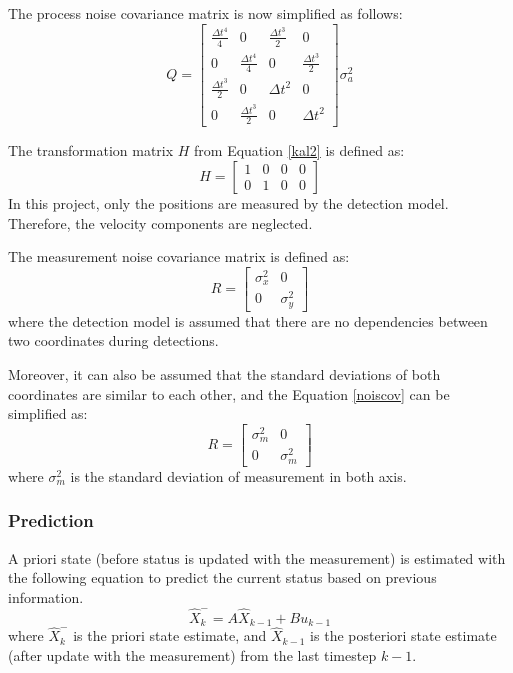 The process noise covariance matrix is now simplified as follows:
\begin{equation} \label{covQsimp}
Q = 
\begin{bmatrix}
    \frac{\Delta t^4}{4} & 0 & \frac{\Delta t^3}{2} & 0 \\
    0 & \frac{\Delta t^4}{4} & 0 & \frac{\Delta t^3}{2} \\
    \frac{\Delta t^3}{2} & 0 & \Delta t^2 & 0 \\
    0 & \frac{\Delta t^3}{2} & 0 & \Delta t^2
\end{bmatrix}
\sigma_a^2
\end{equation}

The transformation matrix \(H\) from Equation \ref{kal2} is defined as:
\begin{equation} \label{transmat}
H = 
\begin{bmatrix}
    1 & 0 & 0 & 0 \\
    0 & 1 & 0 & 0
\end{bmatrix}
\end{equation}
In this project, only the positions are measured by the detection model. Therefore, the velocity components are neglected. 

The measurement noise covariance matrix is defined as:
\begin{equation} \label{noiscov}
R = 
\begin{bmatrix}
\sigma_x^2 & 0 \\
0 & \sigma_y^2
\end{bmatrix}
\end{equation}
where the detection model is assumed that there are no dependencies between two coordinates during detections.

Moreover, it can also be assumed that the standard deviations of both coordinates are similar to each other, and the Equation \ref{noiscov} can be simplified as:
\begin{equation}
    \label{noiscovsimp}
    R=
    \begin{bmatrix}
        \sigma_m^2 & 0 \\
        0 & \sigma_m^2
    \end{bmatrix}
\end{equation}
where \(\sigma_m^2\) is the standard deviation of measurement in both axis. 

\subsubsection{Prediction}
A priori state (before status is updated with the measurement) is estimated with the following equation to predict the current status based on previous information.
\begin{equation}
    \label{priori}
    \hat{X}_k^- = A\hat{X}_{k-1} + B u_{k-1}
\end{equation}
where \(\hat{X}_k^-\) is the priori state estimate, and \(\hat{X}_{k-1}\) is the posteriori state estimate (after update with the measurement) from the last timestep \(k-1\). 

